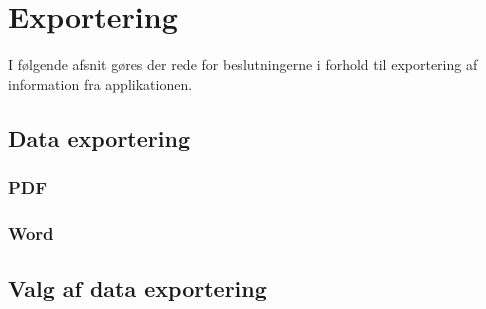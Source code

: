 \section{Exportering}                                   
I følgende afsnit gøres der rede for beslutningerne i forhold til exportering af information fra applikationen.

\subsection{Data exportering}
\subsubsection{PDF}

\subsubsection{Word}

\subsection{Valg af data exportering}
